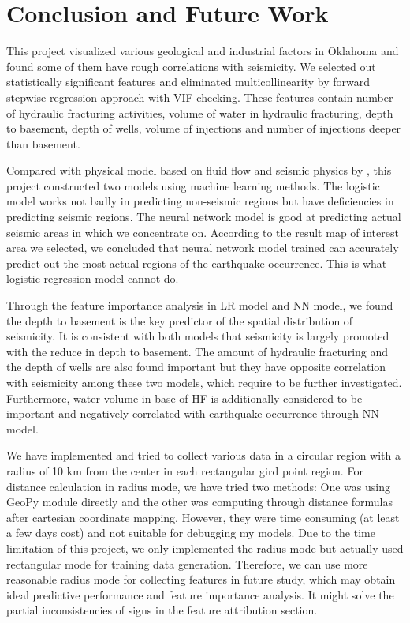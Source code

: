 \documentclass[final-report]{report-template}
\begin{document}
\section{Conclusion and Future Work}
\label{sec:conclusion}
This project visualized various geological and industrial factors in Oklahoma and found some of them have rough correlations with seismicity. 
We selected out statistically significant features and eliminated multicollinearity by forward stepwise regression approach with VIF checking.
These features contain number of hydraulic fracturing activities, volume of water in hydraulic fracturing, depth to basement, depth of wells, volume of injections and number of injections deeper than basement.

Compared with physical model based on fluid flow and seismic physics by \citep{norbeck2018hydromechanical}, this project constructed two models using machine learning methods.
The logistic model works not badly in predicting non-seismic regions but have deficiencies in predicting seismic regions. 
The neural network model is good at predicting actual seismic areas in which we concentrate on.
According to the result map of interest area we selected, we concluded that neural network model trained can accurately predict out the most actual regions of the earthquake occurrence.
This is what logistic regression model cannot do. 

Through the feature importance analysis in LR model and NN model, we found the depth to basement is the key predictor of the spatial distribution of seismicity. 
It is consistent with both models that seismicity is largely promoted with the reduce in depth to basement.
The amount of hydraulic fracturing and the depth of wells are also found important but they have opposite correlation with seismicity among these two models, which require to be further investigated.
Furthermore, water volume in base of HF is additionally considered to be important and negatively correlated with earthquake occurrence through NN model.

We have implemented and tried to collect various data in a circular region with a radius of 10 km from the center in each rectangular gird point region.
For distance calculation in radius mode, we have tried two methods: One was using GeoPy module directly and the other was computing through distance formulas after cartesian coordinate mapping. 
However, they were time consuming (at least a few days cost) and not suitable for debugging my models. Due to the time limitation of this project, we only implemented the radius mode but actually used rectangular mode for training data generation. 
Therefore, we can use more reasonable radius mode for collecting features in future study, which may obtain ideal predictive performance and feature importance analysis. It might solve the partial inconsistencies of signs in the feature attribution section.
\end{document}
